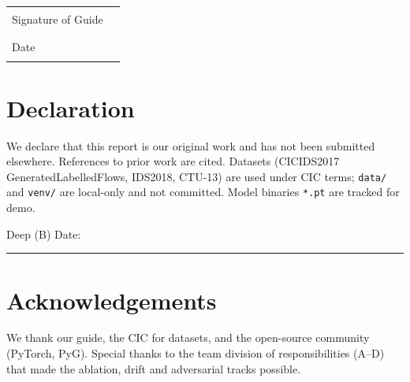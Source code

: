 \documentclass[12pt,a4paper,oneside]{report}
\begin{document}
\vspace{1.5cm}
\noindent\begin{tabular}{ll}
Signature of Guide & \rule{6cm}{0.4pt}\\
Date & \rule{6cm}{0.4pt}\\
\end{tabular}
\clearpage

\chapter*{Declaration}
We declare that this report is our original work and has not been submitted elsewhere. References to prior work are cited. Datasets (CICIDS2017 GeneratedLabelledFlows, IDS2018, CTU-13) are used under CIC terms; \texttt{data/} and \texttt{venv/} are local-only and not committed. Model binaries \texttt{*.pt} are tracked for demo.

\vspace{1.5cm}
\noindent Deep (B) \hfill Date: \rule{3cm}{0.4pt}
\clearpage

\chapter*{Acknowledgements}
We thank our guide, the CIC for datasets, and the open-source community (PyTorch, PyG). Special thanks to the team division of responsibilities (A--D) that made the ablation, drift and adversarial tracks possible.

\end{document}
